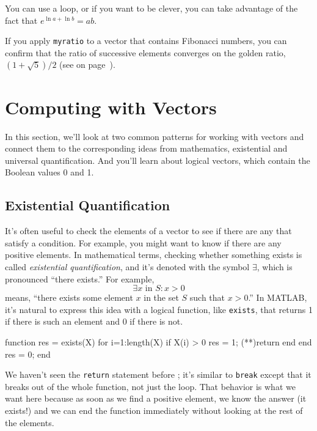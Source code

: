 You can use a loop, or if you want to be clever, you can take
advantage of the fact that $e^{\ln a + \ln b} = a b$.

If you apply \lstinline{myratio} to a vector that contains Fibonacci
numbers, you can confirm that the ratio of successive elements
converges on the golden ratio, $(1+\sqrt{5})/2$ (see
 on page~\pageref{fibratio}).



\section{Computing with Vectors}

In this section, we'll look at two common patterns for working with vectors and connect them to the corresponding ideas from mathematics, existential and universal quantification.  And you'll learn about logical vectors, which contain the Boolean values 0 and 1. 

\subsection{Existential Quantification}


It's often useful to check the elements of a vector to see if there
are any that satisfy a condition.  For example, you might want to
know if there are any positive elements.  In mathematical terms, checking whether something exists is called \emph{existential quantification}, and it's denoted with
the symbol $\exists$, which is pronounced ``there exists.''  For example,
%
\[ \exists x \mbox{~in~} S: x>0  \]
%
means, ``there exists some element $x$ in the set $S$ such that
$x>0$.''  In MATLAB, it's natural to express this idea with a logical
function, like \lstinline{exists}, that returns 1 if there is such an
element and 0 if there is not.

\begin{code}
function res = exists(X)
    for i=1:length(X)
        if X(i) > 0
            res = 1;
            (**)return
        end
    end
    res = 0;
end
\end{code}

We haven't seen the \lstinline{return} statement before ; it's similar
to \lstinline{break} except that it breaks out of the whole function, not
just the loop.  That behavior is what we want here because as soon
as we find a positive element, we know the answer (it exists!) and
we can end the function immediately without looking at the rest
of the elements.

